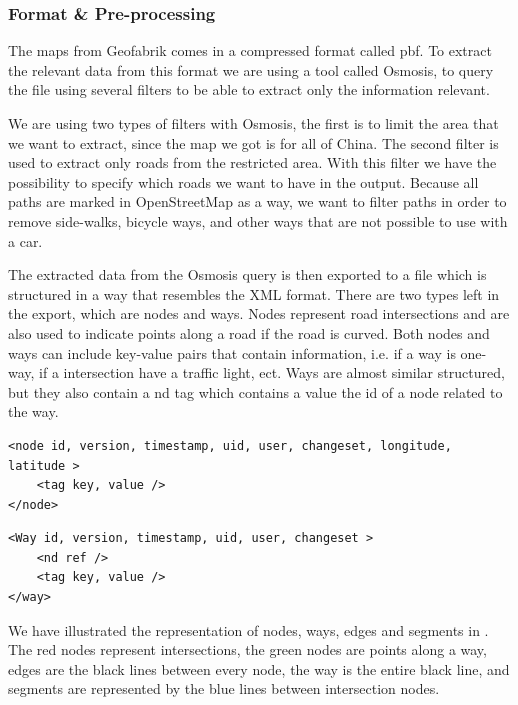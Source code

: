 \subsubsection{Format \& Pre-processing}
\label{chap:FormatPre-processing}
The maps from Geofabrik comes in a compressed format called pbf. To extract the relevant data from this format we are using a tool called Osmosis, to query the file using several filters to be able to extract only the information relevant.

We are using two types of filters with Osmosis, the first is to limit the area that we want to extract, since the map we got is for all of China. The second filter is used to extract only roads from the restricted area. With this filter we have the possibility to specify which roads we want to have in the output. Because all paths are marked in OpenStreetMap as a way, we want to filter paths in order to remove side-walks, bicycle ways, and other ways that are not possible to use with a car.

The extracted data from the Osmosis query is then exported to a file which is structured in a way that resembles the XML format. There are two types left in the export, which are nodes and ways. Nodes represent road intersections and are also used to indicate points along a road if the road is curved. Both nodes and ways can include key-value pairs that contain information, i.e. if a way is one-way, if a intersection have a traffic light, ect.
Ways are almost similar structured, but they also contain a nd tag which contains a value the id of a node related to the way.

\begin{lstlisting}[style=XML, caption=Node representation]
<node id, version, timestamp, uid, user, changeset, longitude, latitude >
	<tag key, value />
</node>
\end{lstlisting}

\begin{lstlisting}[style=XML, caption=Way representation]
<Way id, version, timestamp, uid, user, changeset >
	<nd ref />
	<tag key, value />
</way>
\end{lstlisting}

We have illustrated the representation of nodes, ways, edges and segments in . The red nodes represent intersections, the green nodes are points along a way, edges are the black lines between every node, the way is the entire black line, and segments are represented by the blue lines between intersection nodes.

